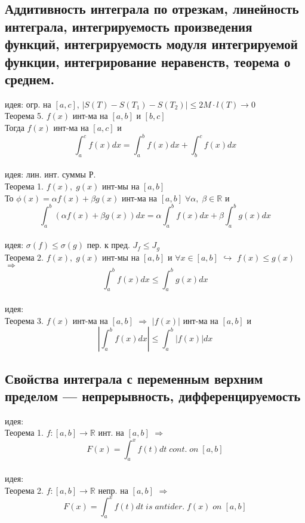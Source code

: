 \documentclass{article}
\begin{document}
\subsection{Аддитивность интеграла по отрезкам, линейность интеграла, интегрируемость произведения функций, интегрируемость модуля интегрируемой функции, интегрирование неравенств, теорема о среднем.}
идея: огр. на $[a,c]$,  $|S(T)-S(T_1)-S(T_2)| \leq 2M \cdot l(T) \rightarrow 0$ \\
Теорема 5. $f(x)$ инт-ма на $[a,b]$ и $[b,c]$ \\
Тогда $f(x)$ инт-ма на $[a,c]$ и
\begin{equation*}
    \int_a^c f(x) dx = \int_a^b f(x) dx + \int_b^c f(x) dx
\end{equation*}
\\
идея: лин. инт. суммы Р. \\
Теорема 1. $f(x), \; g(x)$ инт-мы на $[a,b]$ \\
То $\phi (x) = \alpha f(x) + \beta g(x) $ инт-ма на $[a,b] \; \forall \alpha, \; \beta \in \mathbb R$ и
\begin{equation*}
    \int_a^b (\alpha f(x) + \beta g(x)) dx = \alpha \int_a^b f(x) dx + \beta \int_a^b g(x) dx
\end{equation*}
\\
идея: $\sigma (f) \leq \sigma (g)$ пер. к пред. $J_f \leq J_g$ \\
Теорема 2. $f(x), \; g(x)$ инт-мы на $[a,b]$ и $\forall x \in [a,b]$ $\hookrightarrow$ $f(x) \leq g(x)$ $\Rightarrow$
\begin{equation*}
    \int_a^b f(x) dx \leq \int_a^b g(x) dx
\end{equation*}
\\
идея: \\
Теорема 3. $f(x)$ инт-ма на $[a,b]$ $\Rightarrow$ $|f(x)|$ инт-ма на $[a,b]$ и
\begin{equation*}
    |\int_a^b f(x) dx| \leq \int_a^b |f(x)| dx
\end{equation*}
\subsection{Свойства интеграла с переменным верхним пределом — непрерывность, дифференцируемость}
идея:  \\
Теорема 1. $f: [a,b] \rightarrow \mathbb R$ инт. на $[a,b]$ $\Rightarrow$ \\
\begin{equation*}
    F(x) = \int_a^x f(t) dt \; cont. \; on \; [a,b]
\end{equation*}
\\
идея:  \\
Теорема 2. $f: [a,b] \rightarrow \mathbb R$ непр. на $[a,b]$ $\Rightarrow$
\begin{equation*}
    F(x) = \int_a^x f(t) dt \; is \; antider. \; f(x) \; on \; [a,b]
\end{equation*}
\end{document}
